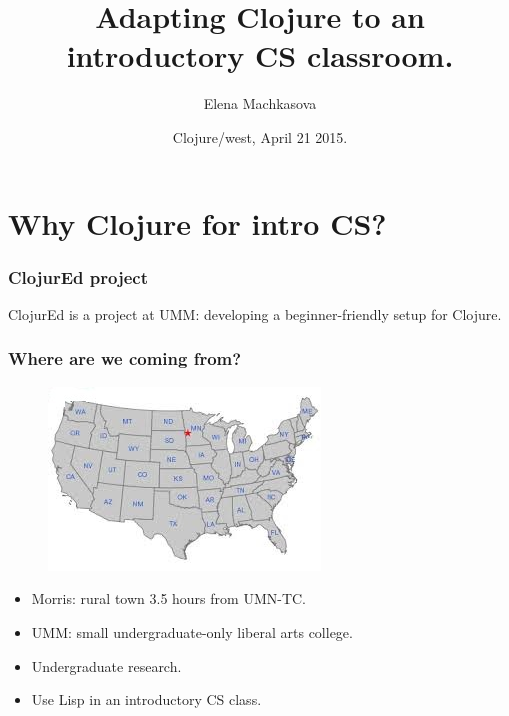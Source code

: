 \documentclass{beamer}
\begin{document}
\title{Adapting Clojure to an introductory CS classroom.}
\author{Elena Machkasova}
\date[]  
{Clojure/west, April 21 2015.}

\begin{frame}
  \titlepage
\end{frame}

\section{Why Clojure for intro CS?}

\begin{frame}
   \frametitle{ClojurEd project}
ClojurEd is a project at UMM: developing a beginner-friendly setup for Clojure. 
\end{frame}

\begin{frame}
   \frametitle{Where are we coming from?}
\begin{figure}
\includegraphics[scale=0.7]{morris.jpg}
\end{figure}
\begin{itemize}
\item Morris: rural town 3.5 hours from UMN-TC. 
\item UMM:  small undergraduate-only liberal arts college.
\item Undergraduate research. 
\item<2>Use Lisp in an introductory CS class. 
\end{itemize}
\end{frame}
\end{document}
